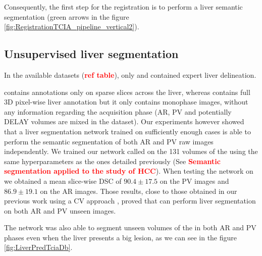 Consequently, the first step for the  registration is to perform a
liver semantic segmentation (green arrows in the figure \ref{fig:RegistrationTCIA_pipeline_vertical2}).

\subsection{Unsupervised liver
segmentation}\label{tcia-db-unsupervised-liver-segmentation}

In the available datasets (\textcolor{red}{\textbf{ref table}}), only  and
 contained expert liver delineation.

 contains annotations only on sparse slices across the liver,
whereas  contains full 3D pixel-wise liver annotation but it only
contains monophase images, without any information regarding the
acquisition phase (AR, PV and potentially DELAY volumes are mixed in the dataset).
Our experiments however showed that a liver segmentation network trained
on sufficiently enough cases is able to perform the semantic
segmentation of both AR and PV raw images independently.
We trained our network called  on the 131 volumes of the
 using the same hyperparameters as the ones detailed
previously (See \textcolor{red}{\textbf{Semantic segmentation applied to the study of HCC}}). When testing the  network on  we
obtained a mean slice-wise DSC of $ 90.4 \pm 17.5 $ on the PV images and
$ 86.9 \pm 19.1 $ on the AR images. Those results, close to those obtained
in our previous work using a CV approach \cite{Ouhmich2019}, proved that  can
perform liver segmentation on both AR and PV unseen images.

The  network was also able to segment unseen volumes of the
 in both AR and PV phases even when the liver presents a big
lesion, as we can see in the figure \ref{fig:LiverPredTciaDb}.

